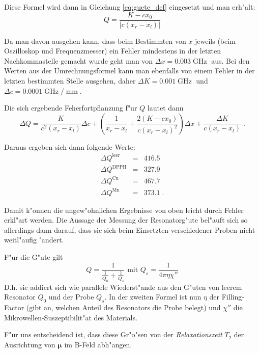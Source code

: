 \documentclass[a4paper,12pt]{article}
\renewcommand{\vec}[1]{\ensuremath{\boldsymbol{#1}}}
\newcommand{\abs}[0]{\bigskip\noindent}
\begin{document}
Diese Formel wird dann in Gleichung \eqref{eq:guete_def} eingesetzt
und man erh"alt:
\begin{equation}
	Q = \frac{K - c x_0}{| c ( x_r - x_l ) |}
\end{equation}

Da man davon ausgehen kann, dass beim Bestimmten von $x$ jeweils (beim
Oszilloskop und Frequenzmesser) ein Fehler mindestens in der letzten
Nachkommastelle gemacht wurde geht man von $\Delta x =
0.003\operatorname{GHz}$ aus. Bei den Werten aus der Umrechnungsformel
kann man ebenfalls von einem Fehler in der letzten bestimmten Stelle
ausgehen, daher $\Delta K = 0.001\operatorname{GHz}$ und $\Delta c
= 0.0001\operatorname{GHz}/\operatorname{mm}$.

Die sich ergebende Feherfortpflanzung f"ur $Q$ lautet dann
\begin{equation}
	\Delta Q = \frac{K}{c^2 (x_r - x_l)} {\Delta c} + \left(
        \frac{1}{x_r - x_l} + \frac{2 (K - c x_0)}{c (x_r - x_l)^2}\right)
        {\Delta x} + \frac{\Delta K}{c (x_r - x_l)} \;.
\end{equation}

Daraus ergeben sich dann folgende Werte:
\begin{eqnarray*}
\Delta Q^\text{leer} &=& 416.5 \\
\Delta Q^\text{DPPH} &=& 327.9 \\
\Delta Q^\text{Cu} &=& 467.7 \\ 
\Delta Q^\text{Mn} &=& 373.1 \;.
\end{eqnarray*}

Damit k"onnen die ungew"ohnlichen Ergebnisse von oben leicht durch
Fehler erkl"art werden. Die Aussage der Messung der Resonatorg"ute
bel"auft sich so allerdings dann darauf, dass sie sich beim Einsetzten
verschiedener Proben nicht weitl"aufig "andert.




\abs
F"ur die G"ute gilt
\begin{equation}
  \label{eq:6}
  Q = \frac{ 1 } { \frac{1}{Q_0} + \frac{1}{Q_s} } \text{ mit } Q_s =
  \frac{1}{4\pi \eta \chi'' }
\end{equation}
D.h. sie addiert sich wie parallele Wiederst"ande aus den G"uten von
leerem Resonator $Q_0$ und der Probe $Q_s$. In der zweiten Formel ist
nun  $\eta$ der Filling-Factor (gibt an, welchen Anteil des Resonators
die Probe belegt)
und $\chi''$ die Mikrowellen-Suszeptibilit"at des Materials.

F"ur uns entscheidend ist, dass diese Gr"o"sen von der
\emph{Relaxationszeit} $T_2$ der Ausrichtung von $\vec \mu$ im B-Feld
abh"angen.
\end{document}
